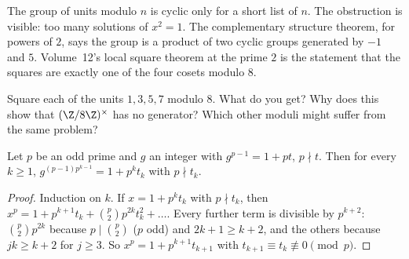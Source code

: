 The group of units modulo $n$ is cyclic only for a short list of $n$. The obstruction is visible: too many solutions of $x^2=1$. The complementary structure theorem, for powers of $2$, says the group is a product of two cyclic groups generated by $-1$ and $5$. Volume~12's local square theorem at the prime $2$ is the statement that the squares are exactly one of the four cosets modulo $8$.

\begin{think}
Square each of the units $1,3,5,7$ modulo $8$. What do you get? Why does this show that $(\Z/8\Z)^\times$ has no generator? Which other moduli might suffer from the same problem?
\end{think}

\begin{lemma}\label{lem:lift}
Let $p$ be an odd prime and $g$ an integer with $g^{p-1}=1+pt$, $p\nmid t$. Then for every $k\ge1$, $g^{(p-1)p^{k-1}}=1+p^kt_k$ with $p\nmid t_k$.
\end{lemma}
\begin{proof}
Induction on $k$. If $x=1+p^kt_k$ with $p\nmid t_k$, then
$x^p=1+p^{k+1}t_k+\binom p2p^{2k}t_k^2+\dots$. Every further term is divisible by $p^{k+2}$: $\binom p2p^{2k}$ because $p\mid\binom p2$ ($p$ odd) and $2k+1\ge k+2$, and the others because $jk\ge k+2$ for $j\ge3$. So $x^p=1+p^{k+1}t_{k+1}$ with $t_{k+1}\equiv t_k\not\equiv0\pmod p$.
\end{proof}

